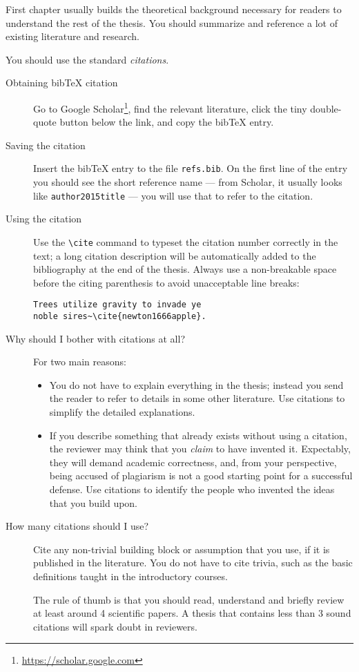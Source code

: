 First chapter usually builds the theoretical background necessary for readers to understand the rest of the thesis. You should summarize and reference a lot of existing literature and research.

You should use the standard \emph{citations}.

\begin{description}
\item[Obtaining bibTeX citation] Go to Google Scholar\footnote{\url{https://scholar.google.com}}, find the relevant literature, click the tiny double-quote button below the link, and copy the bibTeX entry.
\item[Saving the citation] Insert the bibTeX entry to the file \texttt{refs.bib}. On the first line of the entry you should see the short reference name --- from Scholar, it usually looks like \texttt{author2015title} --- you will use that to refer to the citation.
\item[Using the citation] Use the \verb|\cite| command to typeset the citation number correctly in the text; a long citation description will be automatically added to the bibliography at the end of the thesis. Always use a non-breakable space before the citing parenthesis to avoid unacceptable line breaks:
\begin{Verbatim}
Trees utilize gravity to invade ye
noble sires~\cite{newton1666apple}.
\end{Verbatim}
\item[Why should I bother with citations at all?] For two main reasons:
\begin{itemize}
\item You do not have to explain everything in the thesis; instead you send the reader to refer to details in some other literature. Use citations to simplify the detailed explanations.
\item If you describe something that already exists without using a citation, the reviewer may think that you \emph{claim} to have invented it. Expectably, they will demand academic correctness, and, from your perspective, being accused of plagiarism is not a good starting point for a successful defense. Use citations to identify the people who invented the ideas that you build upon.
\end{itemize}
\item[How many citations should I use?]
Cite any non-trivial building block or assumption that you use, if it is published in the literature. You do not have to cite trivia, such as the basic definitions taught in the introductory courses.

The rule of thumb is that you should read, understand and briefly review at least around 4 scientific papers. A thesis that contains less than 3 sound citations will spark doubt in reviewers.
\end{description}

